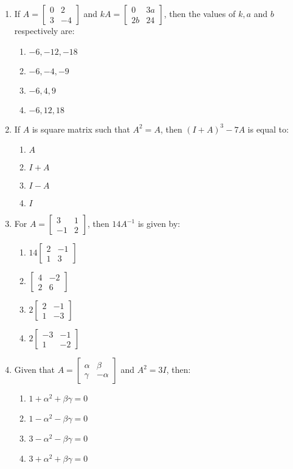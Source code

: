 \documentclass{article}
\providecommand{\myvec}[1]{\begin{bmatrix}#1\end{bmatrix}}
\begin{document}
\begin{enumerate}
    \item If $A =\myvec{0&2\\3&-4}$ and $kA =\myvec{0&3a\\2b&24}$, then the values of $k ,a$ and $b$ respectively are:\\
    \begin{enumerate}
        \item $-6, -12, -18$
        \item $-6, -4, -9$
        \item $-6, 4, 9$
        \item $-6, 12, 18$
    \end{enumerate}
    
    \item If $A$ is square matrix such that $A^2 = A$, then $(I + A)^3 - 7A$ is equal to:\\
    \begin{enumerate}
        \item $A$
        \item $I + A$
        \item $I - A$
        \item $I$ 
    \end{enumerate}
    
    \item For $A =\myvec{3&1\\-1& 2}$, then $14A^{-1}$ is given by:\\
    \begin{enumerate}
        \item $14 \myvec{2 &-1\\1 &3}$
        \item $\myvec{4 &-2\\2&6}$
        \item $2\myvec{2&-1\\1&-3}$
        \item $2\myvec{-3&-1\\1&-2}$
    \end{enumerate}
    
    \item Given that $A = 
        \myvec{\alpha & \beta \\ \gamma & -\alpha}$ and $A^2 = 3I$, then:
    \begin{enumerate}
        \item $1 + \alpha^2 + \beta\gamma = 0$
        \item $1 - \alpha^2 - \beta\gamma = 0$
        \item $3 - \alpha^2 - \beta\gamma = 0$
        \item $3 + \alpha^2 + \beta\gamma = 0$
    \end{enumerate}
    

\end{enumerate}
\end{document}
